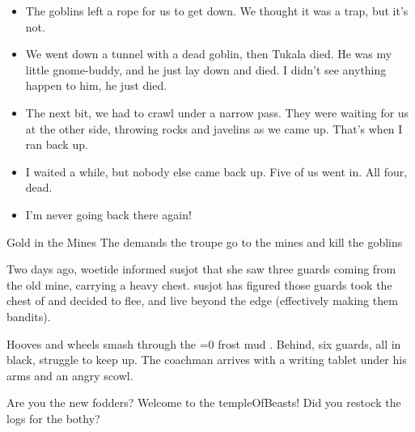 \begin{multicols}{2}
\begin{speechtext}
\begin{itemize}
    \item
    The goblins left a rope for us to get down.
    We thought it was a trap, but it's not.
    
    \item
    We went down a tunnel with a dead goblin, then Tukala died.
    He was my little gnome-buddy, and he just lay down and died.
    I didn't see anything happen to him, he just died.
    
    \item
    The next bit, we had to crawl under a narrow pass.
    They were waiting for us at the other side, throwing rocks and javelins as we came up.
    That's when I ran back up.
    
    \item
    I waited a while, but nobody else came back up.
    Five of us went in.
    All four, dead.
    \item
    I'm never going back there again!
  \end{itemize}
\end{speechtext}

{Gold in the Mines}%
{The  demands the troupe go to the mines and kill the goblins}%

\begin{exampletext}
  Two days ago, \gls{woetide} informed \gls{susjot} that she saw three \glspl{guard} coming from the old mine, carrying a heavy chest.
  \Gls{susjot} has figured those \glspl{guard} took the chest of  and decided to flee, and live beyond the \gls{edge} (effectively making them bandits).
\end{exampletext}

\begin{boxtext}
  Hooves and wheels smash through the
  \ifnum\value{temperature}=0%
    frost
  \else%
    mud
  \fi.
  Behind, six \glspl{guard}, all in black, struggle to keep up.
  The coachman arrives with a writing tablet under his arms and an angry scowl.
  \begin{speechtext}
      Are you the new \glspl{fodder}?
      Welcome to the \gls{templeOfBeasts}!
      Did you restock the logs for the \gls{bothy}?
  \end{speechtext}
\end{boxtext}


\end{multicols}
